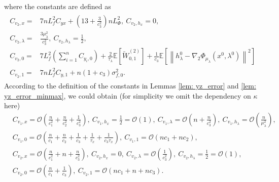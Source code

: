 \documentclass[10pt]{article}
\theoremstyle{remark}
\newcommand{\cO}{\mathcal{O}}
\newcommand{\E}{\mathbb{E}}
\newcommand{\norm}[1]{\left\|#1\right\|}
\begin{document}
where the constants are defined as
\begin{align}
    \begin{aligned}
        C_{v_2, x} = &7nL_f^2C_{yx} + \left(13 + \frac{3}{c_3^2}\right)nL_{\Phi}^2,\ C_{v_2, h_x} = 0,\\
        C_{v_2, \lambda} = &\frac{3\mu_{\lambda}^2}{c_3^2},\ C_{v_2, h_{\lambda}} = \frac{1}{2},\\
        C_{v_2, 0} = &7L_f^2\left(\sum_{i=1}^{n}C_{y_i, 0}\right) + \frac{2}{\tau_{\lambda}}\E\left[\tilde W_{0,1}^{(2)}\right] + \frac{1}{c_3}\E\left[\norm{h_{\lambda}^0 - \nabla_2\Phi_{\mu_{\lambda}}(x^0, \lambda^0)}^2\right] \\
        C_{v_2, 1} = &7nL_f^2C_{y,1} + n(1+c_3)\sigma_{f,0}^2.
    \end{aligned}
\end{align}
According to the definition of the constants in Lemmas \ref{lem: yz_error} and \ref{lem: yz_error_minmax}, we could obtain (for simplicity we omit the dependency on $\kappa$ here)
\begin{align*}
    &C_{v_1, x} = \cO\left(\frac{n}{c_1^2} + \frac{n}{c_2^2} + \frac{1}{c_3^2}\right),\ C_{v_1, h_x} = \frac{1}{2} = \cO\left(1\right),\ C_{v_1,\lambda} = \cO\left(n + \frac{n}{c_3^2}\right),\ C_{v_1, h_{\lambda}} = \cO\left(\frac{n}{\mu_{\lambda}^2}\right),\\
    &C_{v_1, 0} = \cO\left(\frac{n}{c_1} + \frac{n}{c_2} + \frac{1}{c_3} + \frac{1}{\tau_x} + \frac{1}{c_3\tau_x}\right),\ C_{v_1, 1} = \cO\left(nc_1 + nc_2\right), \\
    &C_{v_2, x} = \cO\left(\frac{n}{c_1^2} + n + \frac{n}{c_3^2}\right),\ C_{v_2, h_x} = 0,\ C_{v_2,\lambda} = \cO\left(\frac{1}{c_3^2}\right),\ C_{v_2, h_{\lambda}} = \frac{1}{2} = \cO\left(1\right),\\
    &C_{v_2, 0} = \cO\left(\frac{n}{c_1} + \frac{1}{c_3}\right),\ C_{v_2, 1} = \cO\left(nc_1 + n + nc_3\right).
\end{align*}
\end{document}
